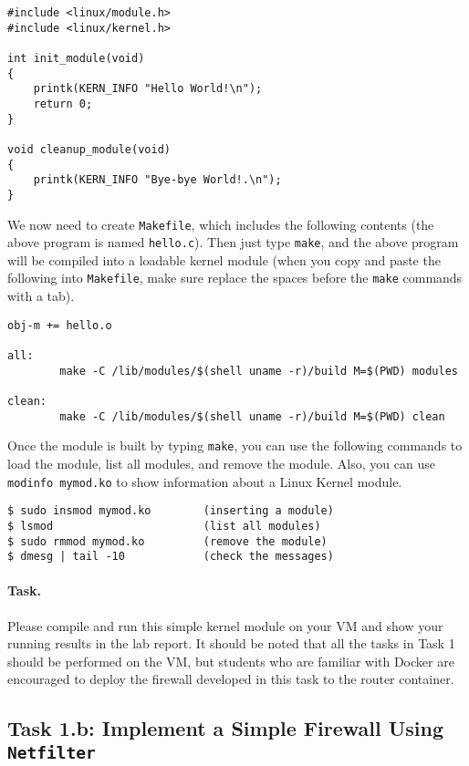 \begin{lstlisting}
#include <linux/module.h>
#include <linux/kernel.h>

int init_module(void)
{
    printk(KERN_INFO "Hello World!\n");
    return 0;
}

void cleanup_module(void)
{
    printk(KERN_INFO "Bye-bye World!.\n");
}
\end{lstlisting}

We now need to create {\tt Makefile}, which includes the following
contents (the above program is named {\tt hello.c}). Then 
just type {\tt make}, and the above program will be compiled
into a loadable kernel module (when you copy and paste the following
into \texttt{Makefile}, make sure replace the spaces before the 
\texttt{make} commands with a tab).


\begin{lstlisting}
obj-m += hello.o

all:
        make -C /lib/modules/$(shell uname -r)/build M=$(PWD) modules

clean:
        make -C /lib/modules/$(shell uname -r)/build M=$(PWD) clean
\end{lstlisting}


Once the module is built by typing {\tt make}, you can use the following commands to 
load the module, list all modules, and remove the module. 
Also, you can use {\tt modinfo mymod.ko} to show information about a 
Linux Kernel module.

\begin{lstlisting}
$ sudo insmod mymod.ko        (inserting a module)
$ lsmod                       (list all modules)
$ sudo rmmod mymod.ko         (remove the module)
$ dmesg | tail -10            (check the messages)
\end{lstlisting}


\paragraph{Task.} Please compile and run this simple kernel module on 
your VM and show your running results in the lab report. 
It should be noted that all the tasks in Task 1 should be 
performed on the VM, but students who are familiar with Docker
are encouraged to deploy the firewall developed in this task
to the router container. 


\subsection{Task 1.b: Implement a Simple Firewall Using \texttt{Netfilter}}  


